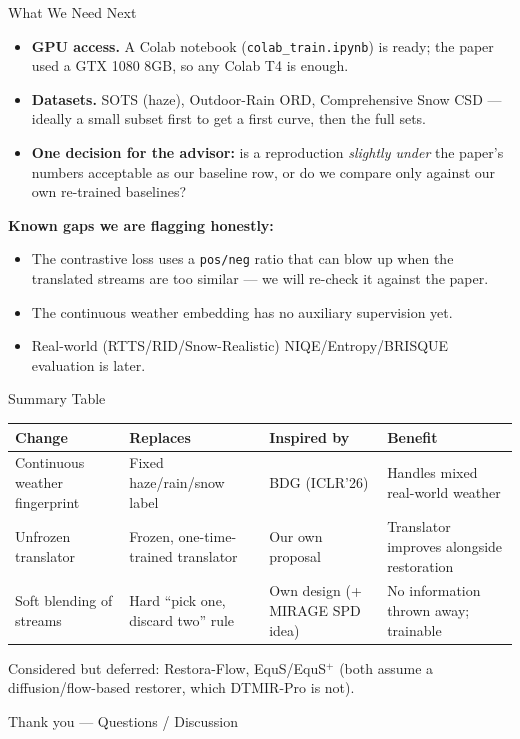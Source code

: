 \documentclass[11pt]{beamer}
\begin{document}
\begin{frame}{What We Need Next}
\begin{itemize}
  \item \textbf{GPU access.} A Colab notebook (\texttt{colab\_train.ipynb}) is ready;
  the paper used a GTX 1080 8GB, so any Colab T4 is enough.
  \item \textbf{Datasets.} SOTS (haze), Outdoor-Rain ORD, Comprehensive Snow CSD ---
  ideally a small subset first to get a first curve, then the full sets.
  \item \textbf{One decision for the advisor:} is a reproduction \emph{slightly under}
  the paper's numbers acceptable as our baseline row, or do we compare only against our
  own re-trained baselines?
\end{itemize}

\vspace{2mm}
\textbf{Known gaps we are flagging honestly:}
\begin{itemize}
  \item The contrastive loss uses a \texttt{pos/neg} ratio that can blow up when the
  translated streams are too similar --- we will re-check it against the paper.
  \item The continuous weather embedding has no auxiliary supervision yet.
  \item Real-world (RTTS/RID/Snow-Realistic) NIQE/Entropy/BRISQUE evaluation is later.
\end{itemize}
\end{frame}

\begin{frame}{Summary Table}
\footnotesize
\renewcommand{\arraystretch}{1.3}
\begin{tabular}{p{2.05cm}p{2.55cm}p{1.65cm}p{2.55cm}}
\toprule
\textbf{Change} & \textbf{Replaces} & \textbf{Inspired by} & \textbf{Benefit} \\
\midrule
Continuous weather fingerprint & Fixed haze/rain/snow label & BDG (ICLR'26) &
Handles mixed real-world weather \\
\addlinespace
Unfrozen translator & Frozen, one-time-trained translator & Our own proposal &
Translator improves alongside restoration \\
\addlinespace
Soft blending of streams & Hard ``pick one, discard two'' rule & Own design (+ MIRAGE SPD idea) &
No information thrown away; trainable \\
\bottomrule
\end{tabular}
\vspace{4mm}

\small Considered but deferred: Restora-Flow, EquS/EquS$^+$ (both assume a
diffusion/flow-based restorer, which DTMIR-Pro is not).
\end{frame}

\begin{frame}
\centering
\Large Thank you --- Questions / Discussion
\end{frame}
\end{document}
